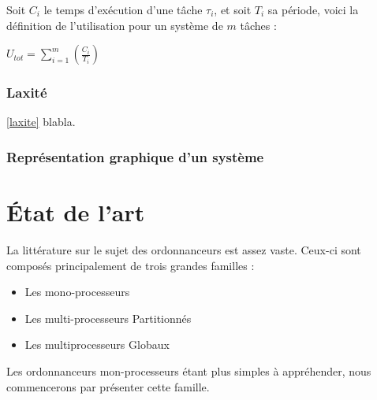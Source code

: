 \documentclass[11pt,a4paper,oneside]{report}
\begin{document}
Soit $C_i$ le temps d'exécution d'une tâche $\tau_i$, et soit $T_i$ sa période, voici la définition de 
l'utilisation pour un système de $m$ tâches :\\
\begin{center}
	$U_{tot} = \sum_{i = 1}^{m}(\frac{C_i}{T_i})$
\end{center}

\subsection{Laxité}
\ref{laxite}
blabla.%

\subsection{Représentation graphique d'un système}



%
%
\chapter{État de l'art}

La littérature sur le sujet des ordonnanceurs est assez vaste. 
Ceux-ci sont composés principalement de trois grandes familles :\\
\begin{itemize}
	\item Les mono-processeurs
	\item Les multi-processeurs Partitionnés
	\item Les multiprocesseurs Globaux
\end{itemize}
Les ordonnanceurs mon-processeurs étant plus simples à appréhender, nous commencerons 
par présenter cette famille.
\end{document}
